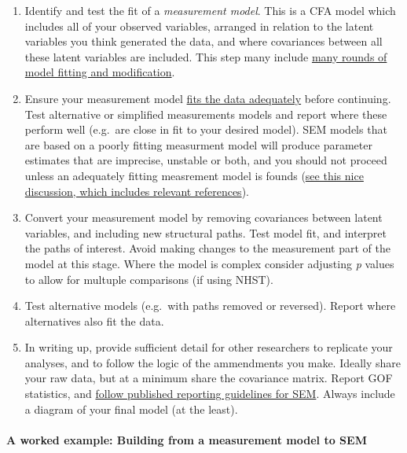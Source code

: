 \documentclass[]{article}
\let\oldparagraph\paragraph
\renewcommand{\paragraph}[1]{\oldparagraph{#1}\mbox{}}
\theoremstyle{definition}
\theoremstyle{definition}
\theoremstyle{definition}
\theoremstyle{remark}
\begin{document}
\begin{enumerate}
\def\labelenumi{\arabic{enumi}.}
\item
  Identify and test the fit of a \emph{measurement model}. This is a CFA
  model which includes all of your observed variables, arranged in
  relation to the latent variables you think generated the data, and
  where covariances between all these latent variables are included.
  This step many include \protect\hyperlink{model-improvement}{many
  rounds of model fitting and modification}.
\item
  Ensure your measurement model \protect\hyperlink{gof}{fits the data
  adequately} before continuing. Test alternative or simplified
  measurements models and report where these perform well (e.g.~are
  close in fit to your desired model). SEM models that are based on a
  poorly fitting measurment model will produce parameter estimates that
  are imprecise, unstable or both, and you should not proceed unless an
  adequately fitting measrement model is founds
  (\href{https://stats.stackexchange.com/a/143465/}{see this nice
  discussion, which includes relevant references}).
\item
  Convert your measurement model by removing covariances between latent
  variables, and including new structural paths. Test model fit, and
  interpret the paths of interest. Avoid making changes to the
  measurement part of the model at this stage. Where the model is
  complex consider adjusting \emph{p} values to allow for multuple
  comparisons (if using NHST).
\item
  Test alternative models (e.g.~with paths removed or reversed). Report
  where alternatives also fit the data.
\item
  In writing up, provide sufficient detail for other researchers to
  replicate your analyses, and to follow the logic of the ammendments
  you make. Ideally share your raw data, but at a minimum share the
  covariance matrix. Report GOF statistics, and
  \protect\hyperlink{XXXTODO}{follow published reporting guidelines for
  SEM}. Always include a diagram of your final model (at the least).
\end{enumerate}

\paragraph{A worked example: Building from a measurement model to
SEM}\label{a-worked-example-building-from-a-measurement-model-to-sem}
\end{document}

